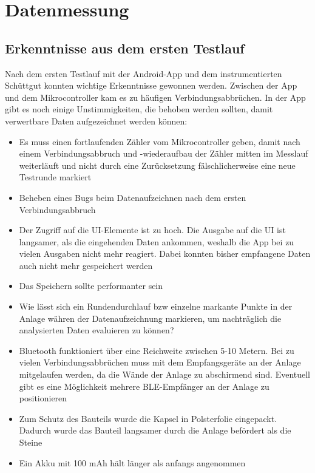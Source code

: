 \section{Datenmessung}
 
\subsection{Erkenntnisse aus dem ersten Testlauf}
Nach dem ersten Testlauf mit der Android-App und dem instrumentierten Schüttgut konnten wichtige Erkenntnisse gewonnen werden.
Zwischen der App und dem Mikrocontroller kam es zu häufigen Verbindungsabbrüchen. In der App gibt es noch einige Unstimmigkeiten, die behoben werden sollten, damit verwertbare Daten aufgezeichnet werden können: 

\begin{itemize}
	\item Es muss einen fortlaufenden Zähler vom Mikrocontroller geben, damit nach einem Verbindungsabbruch und -wiederaufbau der Zähler mitten im Messlauf weiterläuft und nicht durch eine Zurücksetzung fälschlicherweise eine neue Testrunde  markiert
	\item Beheben eines Bugs beim Datenaufzeichnen nach dem ersten Verbindungsabbruch
	\item Der Zugriff auf die UI-Elemente ist zu hoch. Die Ausgabe auf die UI ist langsamer, als die eingehenden Daten ankommen, weshalb die App bei zu vielen Ausgaben nicht mehr reagiert. Dabei konnten bisher empfangene Daten auch nicht mehr gespeichert werden
	\item Das Speichern sollte performanter sein
	\item Wie lässt sich ein Rundendurchlauf bzw einzelne markante Punkte in der Anlage währen der Datenaufzeichnung markieren, um nachträglich die analysierten Daten evaluieren zu können?
	\item Bluetooth funktioniert über eine Reichweite zwischen 5-10 Metern. Bei zu vielen Verbindungsabbrüchen muss mit dem Empfangsgeräte an der Anlage mitgelaufen werden, da die Wände der Anlage zu abschirmend sind. Eventuell gibt es eine Möglichkeit mehrere BLE-Empfänger an der Anlage zu positionieren
	\item Zum Schutz des Bauteils wurde die Kapsel in Polsterfolie eingepackt. Dadurch wurde das Bauteil langsamer durch die Anlage befördert als die Steine
	\item Ein Akku mit 100 mAh hält länger als anfangs angenommen
\end{itemize}

